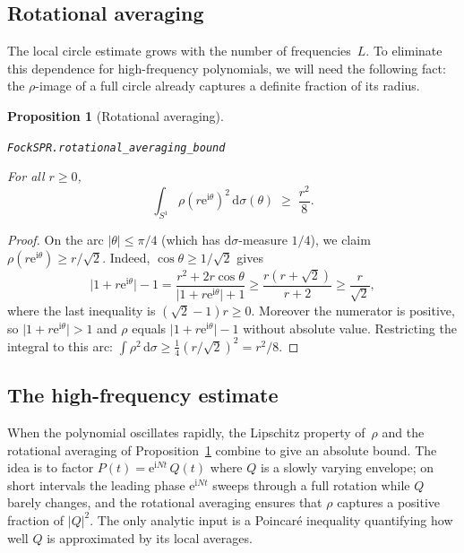 \documentclass[11pt]{amsart}
\newtheorem{proposition}[theorem]{Proposition}
\theoremstyle{definition}
\theoremstyle{remark}
\begin{document}
\subsection{Rotational averaging}\label{sec:rot-avg}

The local circle estimate grows with the number of frequencies~$L$.  To
eliminate this dependence for high-frequency polynomials, we will need the
following fact: the $\rho$-image of a full circle already captures a
definite fraction of its radius.

\begin{proposition}[Rotational averaging]\label{prop:rot-avg}
\par\noindent\texttt{FockSPR.rotational\_averaging\_bound}\par\smallskip
For all $r \ge 0$,
\[
\int_{S^1} \rho(r\mathrm{e}^{\mathrm{i}\theta})^2\,\mathrm{d}\sigma(\theta)
\;\ge\; \frac{r^2}{8}.
\]
\end{proposition}

\begin{proof}
On the arc $\lvert \theta \rvert \le \pi/4$ (which has $\mathrm{d}\sigma$-measure $1/4$),
we claim $\rho(r\mathrm{e}^{\mathrm{i}\theta}) \ge r/\sqrt{2}$.  Indeed,
$\cos\theta \ge 1/\sqrt{2}$ gives
\[
\lvert 1 + r\mathrm{e}^{\mathrm{i}\theta} \rvert - 1
= \frac{r^2 + 2r\cos\theta}{\lvert 1+r\mathrm{e}^{\mathrm{i}\theta} \rvert + 1}
\ge \frac{r(r + \sqrt{2})}{r + 2}
\ge \frac{r}{\sqrt{2}},
\]
where the last inequality is $(\sqrt{2}-1)r \ge 0$.  Moreover the numerator
is positive, so $\lvert 1 + r\mathrm{e}^{\mathrm{i}\theta} \rvert > 1$ and $\rho$ equals
$\lvert 1+r\mathrm{e}^{\mathrm{i}\theta} \rvert - 1$ without absolute value.  Restricting the
integral to this arc:
$\int \rho^2\,\mathrm{d}\sigma \ge \frac{1}{4}(r/\sqrt{2})^2 = r^2/8$.
\end{proof}


\subsection{The high-frequency estimate}\label{sec:high-freq}

When the polynomial oscillates rapidly, the Lipschitz property
of~$\rho$ and the rotational averaging of
Proposition~\ref{prop:rot-avg} combine to give an absolute bound.  The idea
is to factor $P(t) = \mathrm{e}^{\mathrm{i} Nt}\, Q(t)$ where $Q$ is a slowly varying
envelope; on short intervals the leading phase $\mathrm{e}^{\mathrm{i} Nt}$ sweeps through
a full rotation while $Q$ barely changes, and the rotational averaging
ensures that $\rho$ captures a positive fraction of $\lvert Q \rvert^2$.  The only
analytic input is a Poincar\'e inequality quantifying how well $Q$ is
approximated by its local averages.
\end{document}
